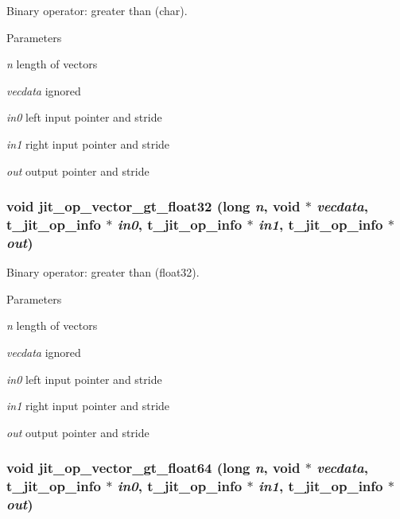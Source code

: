 Binary operator: greater than (char). 
\begin{DoxyParams}{Parameters}
\item[{\em n}]length of vectors \item[{\em vecdata}]ignored \item[{\em in0}]left input pointer and stride \item[{\em in1}]right input pointer and stride \item[{\em out}]output pointer and stride \end{DoxyParams}
\hypertarget{group__opvecmod_ga937a5b0d8e54b7f4fd596350821f3aaf}{
\subsubsection[{jit\_\-op\_\-vector\_\-gt\_\-float32}]{\setlength{\rightskip}{0pt plus 5cm}void jit\_\-op\_\-vector\_\-gt\_\-float32 (long {\em n}, \/  void $\ast$ {\em vecdata}, \/  {\bf t\_\-jit\_\-op\_\-info} $\ast$ {\em in0}, \/  {\bf t\_\-jit\_\-op\_\-info} $\ast$ {\em in1}, \/  {\bf t\_\-jit\_\-op\_\-info} $\ast$ {\em out})}}
\label{group__opvecmod_ga937a5b0d8e54b7f4fd596350821f3aaf}


Binary operator: greater than (float32). 
\begin{DoxyParams}{Parameters}
\item[{\em n}]length of vectors \item[{\em vecdata}]ignored \item[{\em in0}]left input pointer and stride \item[{\em in1}]right input pointer and stride \item[{\em out}]output pointer and stride \end{DoxyParams}
\hypertarget{group__opvecmod_ga803e8bd78c4e3644eb331831704f3ab7}{
\subsubsection[{jit\_\-op\_\-vector\_\-gt\_\-float64}]{\setlength{\rightskip}{0pt plus 5cm}void jit\_\-op\_\-vector\_\-gt\_\-float64 (long {\em n}, \/  void $\ast$ {\em vecdata}, \/  {\bf t\_\-jit\_\-op\_\-info} $\ast$ {\em in0}, \/  {\bf t\_\-jit\_\-op\_\-info} $\ast$ {\em in1}, \/  {\bf t\_\-jit\_\-op\_\-info} $\ast$ {\em out})}}
\label{group__opvecmod_ga803e8bd78c4e3644eb331831704f3ab7}


